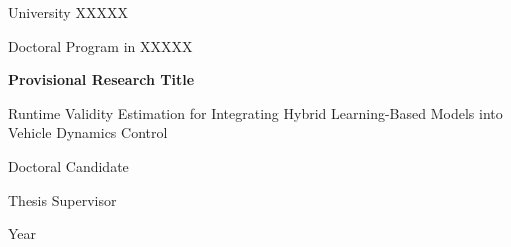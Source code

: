 \documentclass[12pt,a4paper]{report}
\begin{document}

\begin{titlepage}
    \centering

    {\Large University XXXXX\par}
    \vspace{0.5cm}

    {\Large Doctoral Program in XXXXX\par}

    \vspace{3cm}

    {\LARGE \textbf{Provisional Research Title}\par}

    \vspace{1cm}

    {\large
    Runtime Validity Estimation for Integrating
    Hybrid Learning-Based Models into Vehicle Dynamics Control
    \par}

    \vfill

    {\large Doctoral Candidate\par}
    {\large Thesis Supervisor\par}

    \vspace{1cm}

    {\large Year\par}

\end{titlepage}


\end{document}
